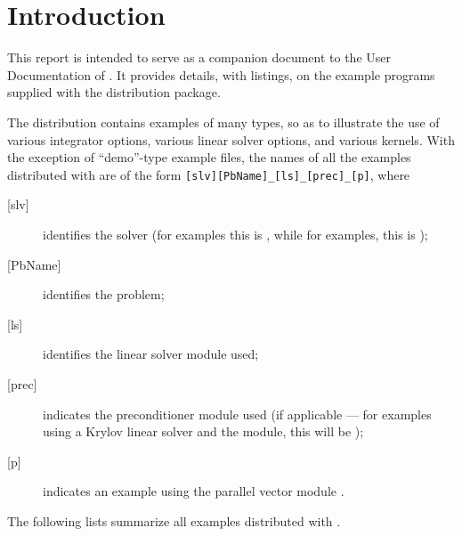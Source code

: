 \section{Introduction}\label{s:ex_intro}

This report is intended to serve as a companion document to the User
Documentation of {\ida} \cite{ida_ug}.  It provides details, with
listings, on the example programs supplied with the {\ida} distribution
package.

The {\ida} distribution contains examples of many types, so as to
illustrate the use of various integrator options, various linear solver
options, and various {\nvector} kernels.
With the exception of ``demo''-type example files, the names of all the examples 
distributed with {\sundials} are of the form \verb![slv][PbName]_[ls]_[prec]_[p]!, 
where
\begin{description}
\item [{[slv]}] identifies the solver (for {\ida} examples this is , 
  while for {\fida} examples, this is );
\item [{[PbName]}] identifies the problem;
\item [{[ls]}] identifies the linear solver module used;
\item [{[prec]}] indicates the {\ida} preconditioner module used
  (if applicable --- for examples using a Krylov linear solver
  and the {\idabbdpre} module, this will be );
\item [{[p]}] indicates an example using the parallel vector module {\nvecp}.
\end{description}

\vspace{0.2in}\noindent
The following lists summarize all examples distributed with {\ida}.


